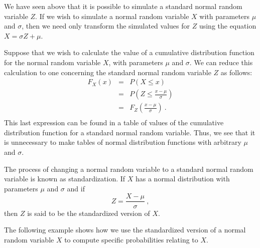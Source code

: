 We have seen above that it is possible to simulate a standard normal random variable $Z$.  
If we wish to simulate a normal random variable $X$ with parameters $\mu$ and $\sigma$,
then we need only transform the simulated values for $Z$ using the equation $X = \sigma Z +
\mu$.
\par
Suppose that we wish to calculate the value of a cumulative distribution function for the normal random
variable $X$, with parameters $\mu$ and $\sigma$.  We can reduce this calculation to one 
concerning the standard normal random variable $Z$ as follows:
\begin{eqnarray*} F_X(x) & = & P(X \leq x) \\
       & = & P\left(Z \leq \frac {x - \mu}\sigma \right) \\
       & = & F_Z\left(\frac {x - \mu}\sigma \right)\ . \\
\end{eqnarray*}
This last expression can be found in a table of values of the cumulative distribution function for
a standard normal random variable.  Thus, we see that it is unnecessary to make tables of normal
distribution functions with arbitrary $\mu$ and $\sigma$. 
\par
The process of changing a normal random variable to a standard normal random variable is 
known as standardization.  If $X$ has a normal distribution with parameters $\mu$ and
$\sigma$ and if
$$ Z = \frac{X - \mu}\sigma\ ,$$
then $Z$ is said to be the standardized version of $X$. 
\par
The following example shows how we use
the standardized version of a normal random variable $X$ to compute specific probabilities 
relating to $X$.

